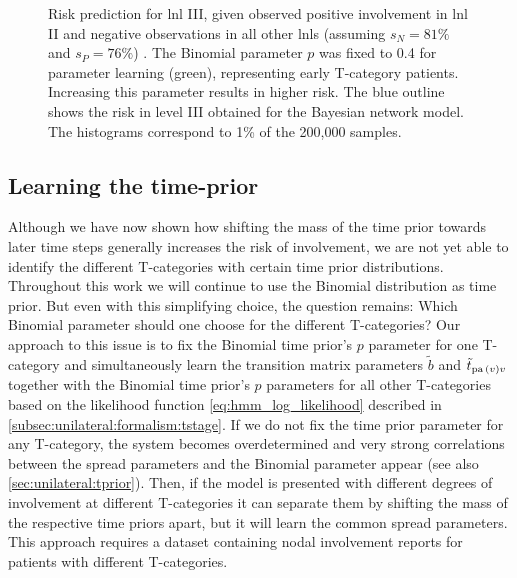 \documentclass[\relativeRoot/main.tex]{subfiles}
\begin{document}
\begin{figure}
    \centering
    \def\svgwidth{0.7\textwidth}
    
    \caption{Risk prediction for \gls{lnl} III, given observed positive involvement in \gls{lnl} II and negative observations in all other \glspl{lnl} (assuming $s_N = 81\%$ and $s_P = 76\%$) \cite{de_bondt_detection_2007}. The Binomial parameter $p$ was fixed to 0.4 for parameter learning (green), representing early T-category patients. Increasing this parameter results in higher risk. The blue outline shows the risk in level III obtained for the Bayesian network model. The histograms correspond to 1\% of the 200,000 samples.}
    \label{fig:unilateral:hmm_risk_increase}
\end{figure}

\subsection{Learning the time-prior}
\label{subsec:unilateral:application:tprior}

Although we have now shown how shifting the mass of the time prior towards later time steps generally increases the risk of involvement, we are not yet able to identify the different T-categories with certain time prior distributions. Throughout this work we will continue to use the Binomial distribution as time prior. But even with this simplifying choice, the question remains: Which Binomial parameter should one choose for the different T-categories? Our approach to this issue is to fix the Binomial time prior's $p$ parameter for one T-category and simultaneously learn the transition matrix parameters $\tilde{b}$ and $\tilde{t}_{\operatorname{pa}{(v)}v}$ together with the Binomial time prior's $p$ parameters for all other T-categories based on the likelihood function \cref{eq:hmm_log_likelihood} described in \cref{subsec:unilateral:formalism:tstage}. If we do not fix the time prior parameter for any T-category, the system becomes overdetermined and very strong correlations between the spread parameters and the Binomial parameter appear (see also \cref{sec:unilateral:tprior}). Then, if the model is presented with different degrees of involvement at different T-categories it can separate them by shifting the mass of the respective time priors apart, but it will learn the common spread parameters. This approach requires a dataset containing nodal involvement reports for patients with different T-categories.
\end{document}
